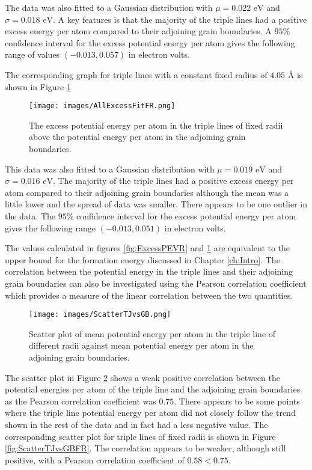 \documentclass[12pt,a4paper,openany]{report}
\newcommand{\ts}[1]{\textrm{#1}}
\begin{document}
The data was also fitted to a Gaussian distribution with $\mu = 0.022 \ts{ eV}$ and $\sigma = 0.018 \ts{ eV}$. A key features is that the majority of the triple lines had a positive excess energy per atom compared to their adjoining grain boundaries. A $95\%$ confidence interval for the excess potential energy per atom
gives the following range of values $(-0.013, 0.057)$ in electron volts.

The corresponding graph for triple lines with a constant fixed radius of $4.05 \textrm{ \AA}$ is shown in Figure \ref{fig:ExcessPEFR}

\begin{figure}[H]
	\texttt{[image: images/AllExcessFitFR.png]} 
	\caption{The excess potential energy per atom in the triple lines of fixed radii above the potential energy per atom in the adjoining grain boundaries.}
	\label{fig:ExcessPEFR}
\end{figure}

This data was also fitted to a Gaussian distribution with $\mu = 0.019 \ts{ eV} $ and $\sigma = 0.016 \ts{ eV}$. The majority of the triple lines had  a positive excess energy per atom compared to their adjoining grain boundaries although the mean was a little lower and the spread of data was smaller. There appears to be one outlier in the data. The $95\%$ confidence interval for the excess potential energy per atom gives the following range $(-0.013, 0.051)$ in electron volts.

The values calculated in figures \ref{fig:ExcessPEVR} and \ref{fig:ExcessPEFR} are equivalent to the upper bound for the formation energy discussed in Chapter \ref{ch:Intro}. The correlation between the potential energy in the triple lines and their adjoining grain boundaries can also be investigated using the Pearson correlation coefficient which provides a measure of the linear correlation between the two quantities.

\begin{figure}[H]
	\texttt{[image: images/ScatterTJvsGB.png]} 
	\caption{Scatter plot of mean potential energy per atom in the triple line of different radii against mean potential energy per atom in the adjoining grain boundaries.}
	\label{fig:ScatterTJvsGB}
\end{figure}

The scatter plot in Figure \ref{fig:ScatterTJvsGB} shows a weak positive correlation between the potential energies per atom of the triple line and the adjoining grain boundaries as the Pearson correlation coefficient was $0.75$. There appears to be some points where the triple line potential energy per atom did not closely follow the trend shown in the rest of the data and in fact had a less negative value. 
\newpage
The corresponding scatter plot for triple lines of fixed radii is shown in Figure \ref{fig:ScatterTJvsGBFR}. The correlation appears to be weaker, although still positive, with a Pearson correlation coefficient of $0.58 < 0.75$. 
\end{document}
